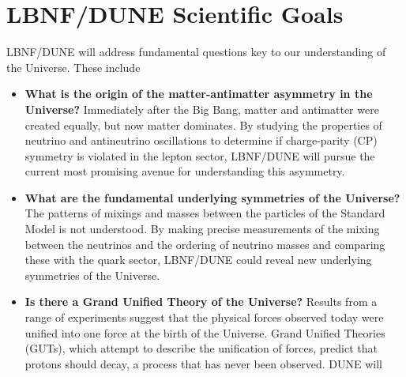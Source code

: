\chapter{LBNF/DUNE Scientific Goals}
\label{ch:physics-goals}




LBNF/DUNE will address fundamental questions key to our understanding of the Universe. These include
\begin{itemize}
   \item {\bf What is the origin of the matter-antimatter asymmetry in the Universe?} Immediately after
                    the Big Bang, matter and antimatter were created equally, but now matter dominates.
                    By studying the properties of neutrino and antineutrino oscillations to determine if charge-parity (CP) symmetry is violated in the lepton sector,   LBNF/DUNE 
                    will pursue the current most promising avenue for understanding this asymmetry.
   \item {\bf What are the fundamental underlying symmetries of the Universe?} The patterns of mixings and masses between the particles of the Standard Model is not understood. By making precise measurements of the mixing between the neutrinos and the ordering of neutrino masses and comparing these with the quark sector, LBNF/DUNE could reveal new underlying symmetries of the Universe.
  \item{\bf  Is there a Grand Unified Theory of the Universe?} Results from a range of experiments suggest that the
                 physical forces observed today were unified into one force at the birth of the Universe.
                Grand Unified Theories (GUTs), which attempt to describe the unification of forces,
                predict that protons should decay, a process that has never been observed. DUNE will 

\end{itemize}

